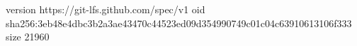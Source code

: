 version https://git-lfs.github.com/spec/v1
oid sha256:3eb48e4dbc3b2a3ae43470c44523ed09d354990749c01c04c63910613106f333
size 21960
